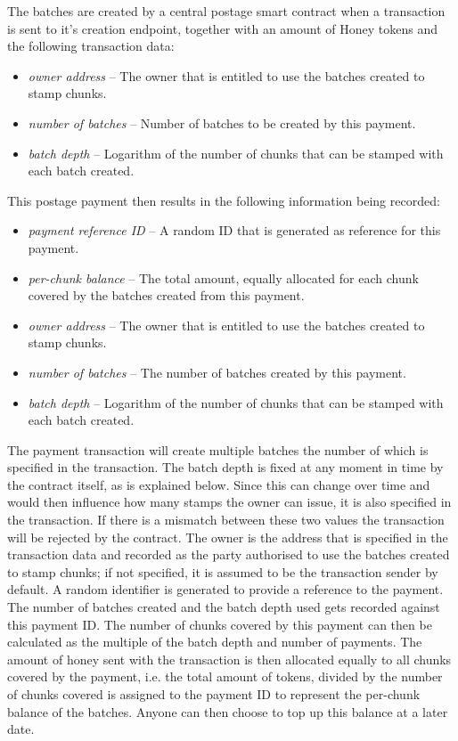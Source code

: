 The batches are created by a central postage smart contract when a transaction is sent to it's creation endpoint, together with an amount of Honey tokens and the following transaction data:

\begin{itemize}
\item \emph{owner address} -- The owner that is entitled to use the batches created to stamp chunks.
\item \emph{number of batches} -- Number of batches to be created by this payment.
\item \emph{batch depth} -- Logarithm of the number of chunks that can be stamped with each batch created.
\end{itemize}

This postage payment then results in the following information being recorded:

\begin{itemize}
\item \emph{payment reference ID} -- A random ID that is generated as reference for this payment.
\item \emph{per-chunk balance} -- The total amount, equally allocated for each chunk covered by the batches created from this payment.
\item \emph{owner address} -- The owner that is entitled to use the batches created to stamp chunks.
\item \emph{number of batches} -- The number of batches created by this payment.
\item \emph{batch depth} -- Logarithm of the number of chunks that can be stamped with each batch created.
\end{itemize}

The payment transaction will create multiple batches the number of which is specified in the transaction. The batch depth is fixed at any moment in time by the contract itself, as is explained below. Since this can change over time and would then influence how many stamps the owner can issue, it is also specified in the transaction. If there is a mismatch between these two values the transaction will be rejected by the contract.
The owner is the address that is specified in the transaction data and recorded as the party authorised to use the batches created to stamp chunks; if not specified, it is assumed to be the transaction sender by default. A random identifier is generated to provide a reference to the payment. The number of batches created and the batch depth used gets recorded against this payment ID. The number of chunks covered by this payment can then be calculated as the multiple of the batch depth and number of payments. The amount of honey sent with the transaction is then allocated equally to all chunks covered by the payment, i.e. the total amount of tokens, divided by the number of chunks covered is assigned to the payment ID to represent the per-chunk balance of the batches. Anyone can then choose to top up this balance at a later date. 


